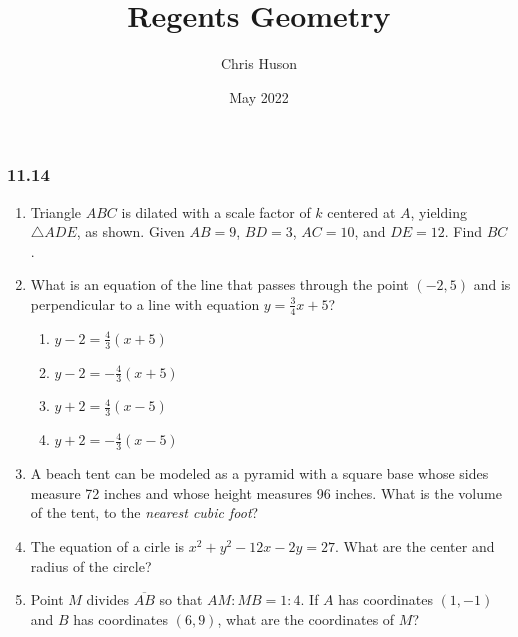 \documentclass[12pt, oneside]{article}
\title{Regents Geometry}
\author{Chris Huson}
\date{May 2022}
\begin{document}
\subsubsection*{11.14 }
\begin{enumerate}[itemsep=1.2cm]
    \item Triangle $ABC$ is dilated with a scale factor of $k$ centered at $A$, yielding $\triangle ADE$, as shown. Given $AB=9$, $BD=3$, $AC=10$, and $DE=12$. Find $BC$.
    \begin{center}
    \end{center}

\item What is an equation of the line that passes through the point $(-2,5)$ and is perpendicular to a line with equation $y=\frac{3}{4}x+5$?
    \begin{multicols}{2}
    \begin{enumerate}
        \item $y-2=\frac{4}{3}(x+5)$
        \item $y-2=-\frac{4}{3}(x+5)$ 
        \item $y+2=\frac{4}{3}(x-5)$
        \item $y+2=-\frac{4}{3}(x-5)$
    \end{enumerate}
    \end{multicols}


\item A beach tent can be modeled as a pyramid with a square base whose sides measure 72 inches and whose height measures 96 inches. What is the volume of the tent, to the \emph{nearest cubic foot}?

\item The equation of a cirle is $x^2+y^2-12x-2y=27$. What are the center and radius of the circle?

\item Point $M$ divides $\overline{AB}$ so that $AM:MB = 1:4$. If $A$ has coordinates $(1,-1)$ and $B$ has coordinates $(6,9)$, what are the coordinates of $M$?


\end{enumerate}
\end{document}

